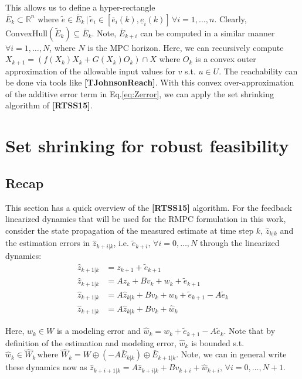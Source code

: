 \documentclass{article}[14pt]
\begin{document}
This allows us to define a hyper-rectangle $\bar{E}_k\subset\mathbb{R}^n \text{ where } \tilde{e} \in \bar{E}_k \,|\, \tilde{e}_i \in [\overline{{e}}_i(k),\underline{{e}}_i(k)]\,\forall i=1,\dotsc,n$. 
Clearly, $\text{ConvexHull}(\tilde{E}_k) \subseteq \bar{E}_k$. Note, $\bar{E}_{k+i}$ can be computed in a similar manner $\forall i=1,\dotsc,N$, where $N$ is the MPC horizon. Here, we can recursively compute $X_{k+1}=(f(X_k)X_k+G(X_k)O_k)\cap X$ where $O_k$ is a convex outer approximation of the allowable input values for $v$ s.t. $u\in U$. The reachability can be done via tools like \textbf{[TJohnsonReach]}.
With this convex over-approximation of the additive error term in Eq.\ref{eq:Zerror}, we can apply the set shrinking algorithm of \textbf{[RTSS15]}.

\section{Set shrinking for robust feasibility}

\subsection{Recap}
\label{sec:Recap}
This section has a quick overview of the \textbf{[RTSS15]} algorithm. For the feedback linearized dynamics that will be used for the RMPC formulation in this work, consider the state propagation of the measured estimate at time step $k$, $\hat{z}_{k|k}$ and the estimation errors in $\hat{z}_{k+i|k}$, i.e. $\tilde{e}_{k+i},\,\forall i=0,\dotsc,N$ through the linearized dynamics:
\begin{subequations}
\begin{align}
        \hat{z}_{k+1|k}&=z_{k+1}+\tilde{e}_{k+1} \\
\hat{z}_{k+1|k}&=A{z}_{k}+Bv_k+w_k+\tilde{e}_{k+1} \\
\hat{z}_{k+1|k}&=A\hat{z}_{k|k}+Bv_k+w_k+\tilde{e}_{k+1}-A\tilde{e}_k \\
\hat{z}_{k+1|k}&=A\hat{z}_{k|k}+Bv_k+\hat{w}_k
\end{align}
\end{subequations}

Here, $w_k\in W$ is a modeling error and $\hat{w}_k=w_k+\tilde{e}_{k+1}-A\tilde{e}_k$. Note that by definition of the estimation and modeling error, $\hat{w}_k$ is bounded s.t. $\hat{w}_k\in\hat{W}_k\,\text{where }\hat{W}_k=W\oplus(-A\bar{E}_{k|k})\oplus\bar{E}_{k+1|k}$. Note, we can in general write these dynamics now as $\hat{z}_{k+i+1|k}=A\hat{z}_{k+i|k}+Bv_{k+i}+\hat{w}_{k+i},\,\forall i=0,\dotsc,N+1$. 
\end{document}
